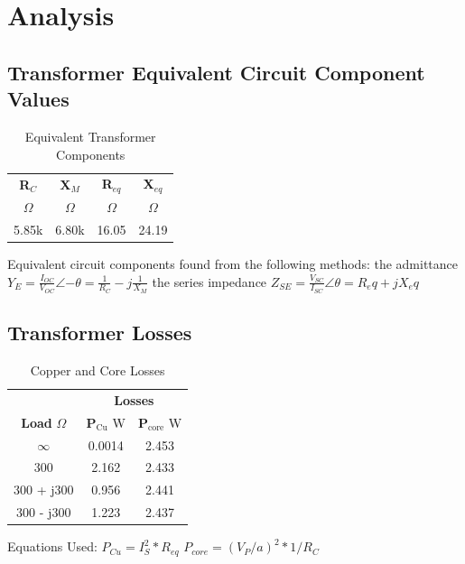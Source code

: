 \documentclass{article}
\begin{document}
\section{Analysis}
\subsection{Transformer Equivalent Circuit Component Values}
\begin{table}[H]
  \centering
  \begin{tabular}{*{4}{c}}
    \textbf{R$_C$} & \textbf{X$_M$}
    & \textbf{R$_{eq}$} & \textbf{X$_{eq}$} \\
    $\Omega$ & $\Omega$ &$\Omega$ & $\Omega$ \\
    \hline
    5.85k & 6.80k & 16.05 & 24.19 \\
  \end{tabular}
  \caption{Equivalent Transformer Components}
  \label{tab:equiv_comp}
\end{table}

Equivalent circuit components found from the following methods:
the admittance $Y_E = \frac{I_{OC}}{V_{OC}}\angle{-\theta} = \frac{1}{R_C} -
j\frac{1}{X_M}$
the series impedance $Z_{SE} = \frac{V_{SC}}{I_{SC}}\angle{\theta} = R_eq + jX_eq$

\subsection{Transformer Losses}
\begin{table}[H]
  \centering
  \begin{tabular}{*{3}{c}}
    & \multicolumn{2}{c}{\textbf{Losses}} \\
    \textbf{Load} $\Omega$ & \textbf{P$_\text{Cu}$} W & \textbf{P$_\text{core}$} W \\
    \hline
    $\infty$ & 0.0014 & 2.453 \\
    300 & 2.162 & 2.433 \\
    300 + j300 & 0.956 & 2.441 \\
    300 - j300 & 1.223 & 2.437 \\
  \end{tabular}
  \caption{Copper and Core Losses}
  \label{tab:power_losses}
\end{table}

Equations Used:
$P_{Cu} = I_S^2 * R_{eq}$
$P_{core} = (V_P / a)^2 * 1/R_{C}$
\end{document}
